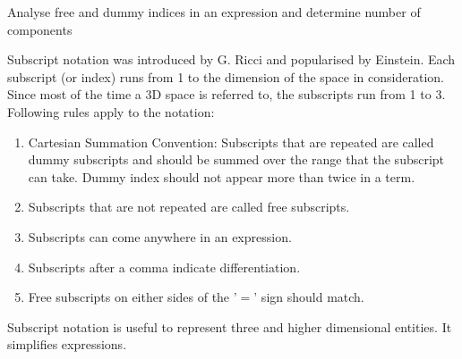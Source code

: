 \begin{lo3}[Tensors]
Analyse free and dummy indices in an expression and determine number of components
\end{lo3}

Subscript notation  was introduced by G. Ricci and popularised by Einstein. Each subscript (or index) runs from 1 to the dimension of the space in consideration. Since most of the time a 3D space is referred to, the subscripts run from 1 to 3. Following rules apply to the notation:

\begin{enumerate}
\item Cartesian Summation Convention:  Subscripts that are repeated are called dummy subscripts and should be summed over the range that the subscript can take. Dummy index should not appear more than twice in a term.
\item Subscripts that are not repeated are called free subscripts. 
\item Subscripts can come anywhere in an expression.
\item Subscripts after a comma indicate differentiation.
\item Free subscripts on either sides of the '$=$' sign should match. 
\end{enumerate} 

Subscript notation is useful to represent three and higher dimensional entities. It simplifies expressions.

